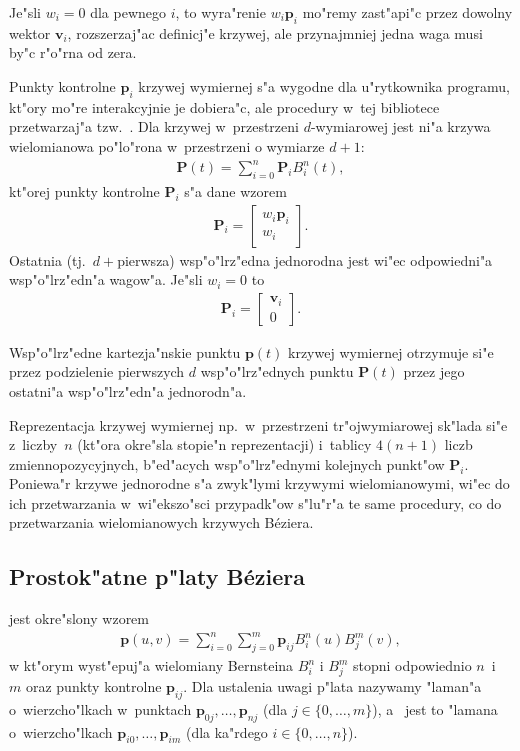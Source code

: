 Je"sli $w_i=0$ dla pewnego $i$, to wyra"renie $w_i\bm{p}_i$ mo"remy
zast"api"c przez dowolny wektor $\bm{v}_i$, rozszerzaj"ac definicj"e
krzywej, ale przynajmniej jedna waga musi by"c r"o"rna od zera.

Punkty kontrolne $\bm{p}_i$ krzywej wymiernej s"a wygodne dla u"rytkownika
programu, kt"ory mo"re interakcyjnie je dobiera"c, ale procedury w~tej
bibliotece przetwarzaj"a tzw.\ .
Dla krzywej w~przestrzeni $d$-wymiarowej jest ni"a krzywa wielomianowa
po"lo"rona w~przestrzeni o wymiarze $d+1$:
\begin{align}
  \bm{P}(t) = \sum_{i=0}^n\bm{P}_iB^n_i(t),
\end{align}
kt"orej punkty kontrolne $\bm{P}_i$ s"a dane wzorem
\begin{align}
  \bm{P}_i = \left[\begin{array}{c}w_i\bm{p}_i \\ w_i \end{array}\right].
\end{align}
Ostatnia (tj.\ $d+{}$pierwsza) wsp"o"lrz"edna jednorodna jest wi"ec
odpowiedni"a wsp"o"lrz"edn"a wagow"a. Je"sli $w_i=0$ to
\begin{align}
  \bm{P}_i = \left[\begin{array}{c}\bm{v}_i \\ 0 \end{array}\right].
\end{align}

Wsp"o"lrz"edne kartezja"nskie punktu $\bm{p}(t)$ krzywej wymiernej otrzymuje
si"e przez podzielenie pierwszych $d$ wsp"o"lrz"ednych punktu $\bm{P}(t)$
przez jego ostatni"a wsp"o"lrz"edn"a jednorodn"a.

Reprezentacja krzywej wymiernej np.\ w~przestrzeni tr"ojwymiarowej sk"lada
si"e z~liczby~$n$ (kt"ora okre"sla stopie"n reprezentacji) i~tablicy
$4(n+1)$ liczb zmiennopozycyjnych, b"ed"acych wsp"o"lrz"ednymi kolejnych
punkt"ow $\bm{P}_i$.
Poniewa"r krzywe jednorodne s"a zwyk"lymi krzywymi wielomianowymi, wi"ec
do ich przetwarzania w~wi"ekszo"sci przypadk"ow s"lu"r"a te same procedury,
co do przetwarzania wielomianowych krzywych B\'{e}ziera.


\subsection{Prostok"atne p"laty B\'{e}ziera}

\begin{sloppypar}
 jest okre"slony wzorem
\begin{align}
  \bm{p}(u,v) = \sum_{i=0}^n\sum_{j=0}^m \bm{p}_{ij}B^n_i(u)B^m_j(v),
\end{align}
w kt"orym wyst"epuj"a wielomiany Bernsteina $B^n_i$ i $B^m_j$ stopni
odpowiednio $n$~i~$m$ oraz punkty kontrolne $\bm{p}_{ij}$. Dla ustalenia
uwagi  p"lata nazywamy "laman"a
o~wierzcho"lkach
w~punktach $\bm{p}_{0j},\ldots,\bm{p}_{nj}$ (dla $j\in\{0,\ldots,m\}$),
a~ jest to "lamana o~wierzcho"lkach
$\bm{p}_{i0},\ldots,\bm{p}_{im}$ (dla ka"rdego $i\in\{0,\ldots,n\}$).
\end{sloppypar}

